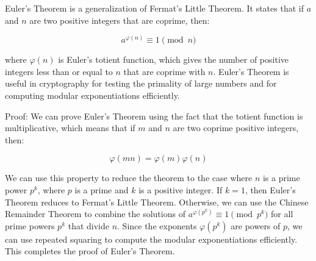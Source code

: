 \documentclass[12pt,openany]{book}
\theoremstyle{definition}
\begin{document}
	Euler's Theorem is a generalization of Fermat's Little Theorem. It states that if $a$ and $n$ are two positive integers that are coprime, then:
	
	$$a^{\varphi(n)} \equiv 1 \pmod{n}$$
	
	where $\varphi(n)$ is Euler's totient function, which gives the number of positive integers less than or equal to $n$ that are coprime with $n$. Euler's Theorem is useful in cryptography for testing the primality of large numbers and for computing modular exponentiations efficiently.
	
	Proof: We can prove Euler's Theorem using the fact that the totient function is multiplicative, which means that if $m$ and $n$ are two coprime positive integers, then:
	
	$$\varphi(mn) = \varphi(m) \varphi(n)$$
	
	We can use this property to reduce the theorem to the case where $n$ is a prime power $p^k$, where $p$ is a prime and $k$ is a positive integer. If $k=1$, then Euler's Theorem reduces to Fermat's Little Theorem. Otherwise, we can use the Chinese Remainder Theorem to combine the solutions of $a^{\varphi(p^k)} \equiv 1 \pmod{p^k}$ for all prime powers $p^k$ that divide $n$. Since the exponents $\varphi(p^k)$ are powers of $p$, we can use repeated squaring to compute the modular exponentiations efficiently. This completes the proof of Euler's Theorem.
	
\end{document}
